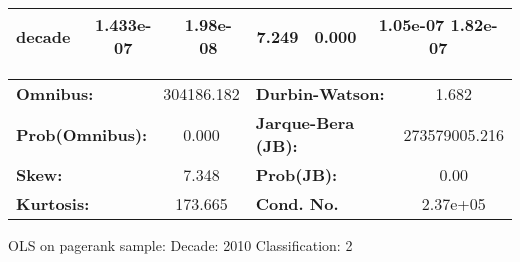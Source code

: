 \begin{center}
\begin{tabular}{lccccc}
\textbf{decade}             &    1.433e-07  &     1.98e-08     &     7.249  &         0.000        &      1.05e-07  1.82e-07       \\
\bottomrule
\end{tabular}
\begin{tabular}{lclc}
\textbf{Omnibus:}       & 304186.182 & \textbf{  Durbin-Watson:     } &       1.682    \\
\textbf{Prob(Omnibus):} &    0.000   & \textbf{  Jarque-Bera (JB):  } & 273579005.216  \\
\textbf{Skew:}          &    7.348   & \textbf{  Prob(JB):          } &        0.00    \\
\textbf{Kurtosis:}      &  173.665   & \textbf{  Cond. No.          } &    2.37e+05    \\
\bottomrule
\end{tabular}
\end{center}
\break
OLS on pagerank sample: Decade: 2010 Classification: 2

